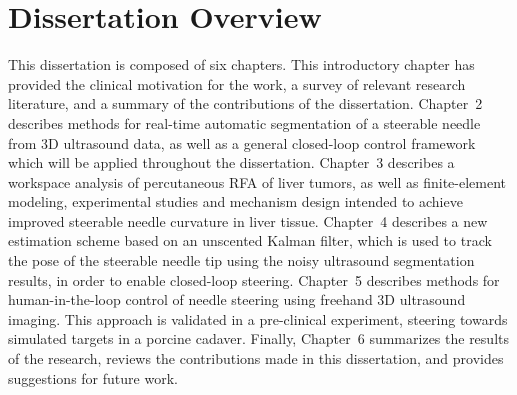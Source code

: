 \section{Dissertation Overview}
This dissertation is composed of six chapters. This introductory chapter has provided the clinical motivation for the work, a survey of relevant research literature, and a summary of the contributions of the dissertation. Chapter~2 describes methods for real-time automatic segmentation of a steerable needle from 3D ultrasound data, as well as a general closed-loop control framework which will be applied throughout the dissertation. Chapter~3 describes a workspace analysis of percutaneous RFA of liver tumors, as well as finite-element modeling, experimental studies and mechanism design intended to achieve improved steerable needle curvature in liver tissue. Chapter~4 describes a new estimation scheme based on an unscented Kalman filter, which is used to track the pose of the steerable needle tip using the noisy ultrasound segmentation results, in order to enable closed-loop steering. Chapter~5 describes methods for human-in-the-loop control of needle steering using freehand 3D ultrasound imaging. This approach is validated in a pre-clinical experiment, steering towards simulated targets in a porcine cadaver. Finally, Chapter~6 summarizes the results of the research, reviews the contributions made in this dissertation, and provides suggestions for future work.